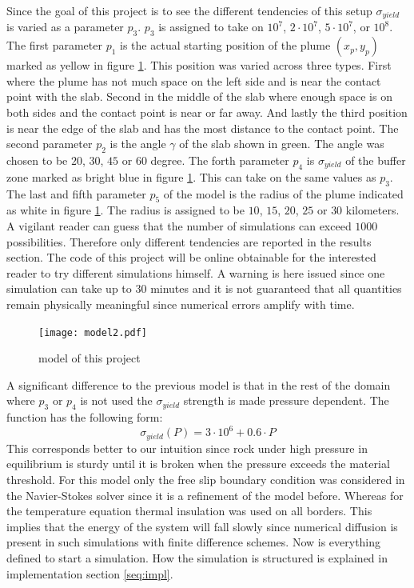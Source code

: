 \documentclass[12pt]{scrartcl}
\begin{document}
Since the goal of this project is to see the different tendencies of this setup $\sigma_{yield}$ is varied as a parameter $p_3$. $p_3$ is assigned to take on $10^7$, $2\cdot 10^7$, $5\cdot 10^7$, or $10^8$. The first parameter $p_1$ is the actual starting position of the plume $(x_p,y_p)$ marked as yellow in figure \ref{fig:tm}. This position was varied across three types. First where the plume has not much space on the left side and is near the contact point with the slab. Second in the middle of the slab where enough space is on both sides and the contact point is near or far away. And lastly the third position is near the edge of the slab and has the most distance to the contact point.
The second parameter $p_2$ is the angle $\gamma$ of the slab shown in green. The angle was chosen to be $20$, $30$, $45$ or $60$ degree. The forth parameter $p_4$ is $\sigma_{yield}$ of the buffer zone marked as bright blue in figure \ref{fig:tm}. This can take on the same values as $p_3$. The last and fifth parameter $p_5$ of the model is the radius of the plume indicated as white in figure \ref{fig:tm}. The radius is assigned to be $10$, $15$, $20$, $25$ or $30$ kilometers. A vigilant reader can guess that the number of simulations can exceed $1000$ possibilities. Therefore only different tendencies are reported in the results section. The code of this project will be online obtainable for the interested reader to try different simulations himself. A warning is here issued since one simulation can take up to $30$ minutes and it is not guaranteed that all quantities remain physically meaningful since numerical errors amplify with time.

\begin{figure}[!ht]
\texttt{[image: model2.pdf]}
\label{fig:tm}
\caption{model of this project}
\end{figure}

A significant difference to the previous model is that in the rest of the domain where $p_3$ or $p_4$ is not used the $\sigma_{yield}$ strength is made pressure dependent. The function has the following form:
\begin{equation}
\sigma_{yield}(P) = 3\cdot 10^6+0.6 \cdot P
\end{equation}
This corresponds better to our intuition since rock under high pressure in equilibrium is sturdy until it is broken when the pressure exceeds the material threshold. For this model only the free slip boundary condition was considered in the Navier-Stokes solver since it is a refinement of the model before. Whereas for the temperature equation thermal insulation was used on all borders. This implies that the energy of the system will fall slowly since numerical diffusion is present in such simulations with finite difference schemes. Now is everything defined to start a simulation. How the simulation is structured is explained in implementation section \ref{seq:impl}.  
\end{document}
